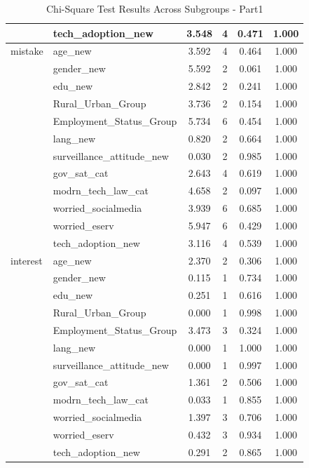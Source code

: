\begin{table}[h]
\begin{tabular}{@{}l l c c c c@{}}
 & tech\_adoption\_new & 3.548 & 4 & 0.471 & 1.000 \\
\midrule
mistake & age\_new & 3.592 & 4 & 0.464 & 1.000 \\
 & gender\_new & 5.592 & 2 & 0.061 & 1.000 \\
 & edu\_new & 2.842 & 2 & 0.241 & 1.000 \\
 & Rural\_Urban\_Group & 3.736 & 2 & 0.154 & 1.000 \\
 & Employment\_Status\_Group & 5.734 & 6 & 0.454 & 1.000 \\
 & lang\_new & 0.820 & 2 & 0.664 & 1.000 \\
 & surveillance\_attitude\_new & 0.030 & 2 & 0.985 & 1.000 \\
 & gov\_sat\_cat & 2.643 & 4 & 0.619 & 1.000 \\
 & modrn\_tech\_law\_cat & 4.658 & 2 & 0.097 & 1.000 \\
 & worried\_socialmedia & 3.939 & 6 & 0.685 & 1.000 \\
 & worried\_eserv & 5.947 & 6 & 0.429 & 1.000 \\
 & tech\_adoption\_new & 3.116 & 4 & 0.539 & 1.000 \\
\midrule
interest & age\_new & 2.370 & 2 & 0.306 & 1.000 \\
 & gender\_new & 0.115 & 1 & 0.734 & 1.000 \\
 & edu\_new & 0.251 & 1 & 0.616 & 1.000 \\
 & Rural\_Urban\_Group & 0.000 & 1 & 0.998 & 1.000 \\
 & Employment\_Status\_Group & 3.473 & 3 & 0.324 & 1.000 \\
 & lang\_new & 0.000 & 1 & 1.000 & 1.000 \\
 & surveillance\_attitude\_new & 0.000 & 1 & 0.997 & 1.000 \\
 & gov\_sat\_cat & 1.361 & 2 & 0.506 & 1.000 \\
 & modrn\_tech\_law\_cat & 0.033 & 1 & 0.855 & 1.000 \\
 & worried\_socialmedia & 1.397 & 3 & 0.706 & 1.000 \\
 & worried\_eserv & 0.432 & 3 & 0.934 & 1.000 \\
 & tech\_adoption\_new & 0.291 & 2 & 0.865 & 1.000 \\
\midrule
\bottomrule
\end{tabular}
\caption{Chi-Square Test Results Across Subgroups - Part1}
\label{tab:test_results}
\end{table}




